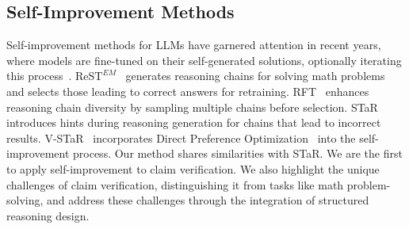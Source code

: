\subsection{Self-Improvement Methods}
Self-improvement methods for LLMs have garnered attention in recent years, where models are fine-tuned on their self-generated solutions, optionally iterating this process~\cite{hosseini2024v}. $\text{ReST}^{EM}$~\cite{singh2023beyond} generates reasoning chains for solving math problems and selects those leading to correct answers for retraining. RFT~\cite{yuan2023scaling} enhances reasoning chain diversity by sampling multiple chains before selection. STaR~\cite{zelikman2022star} introduces hints during reasoning generation for chains that lead to incorrect results. V-STaR~\cite{hosseini2024v} incorporates Direct Preference Optimization~\cite{rafailov2023direct} into the self-improvement process. Our method shares similarities with STaR. We are the first to apply self-improvement to claim verification. We also highlight the unique challenges of claim verification, distinguishing it from tasks like math problem-solving, and address these challenges through the integration of structured reasoning design.